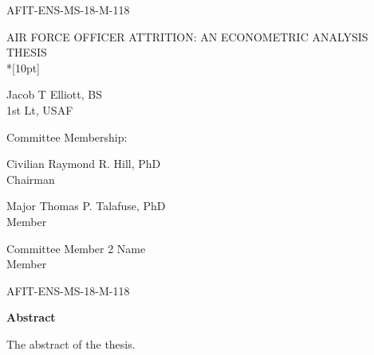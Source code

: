 \documentclass[12pt,letterpaper,toc=flat,oneside]{report}
\theoremstyle{definition}
\theoremstyle{definition}
\theoremstyle{definition}
\theoremstyle{remark}
\begin{document}
	\thispagestyle{empty}
	\setcounter{page}{3}
	\noindent AFIT-ENS-MS-18-M-118
	\vfill
	\begin{center}
	    \MakeUppercase{Air Force Officer Attrition: An Econometric Analysis}\\[10pt]
	    \MakeUppercase{Thesis}\\*[10pt]
	    
	    \begingroup
  \singlespace
    Jacob T Elliott, BS\\ 
    1st Lt, \MakeUppercase{USAF}
    \par
  \endgroup
  
	\bigskip\medskip
	Committee Membership:
	\bigskip\medskip
	
	\begingroup
  \singlespace
    Civilian Raymond R. Hill, PhD\\ 
    Chairman
    \par
  \endgroup
  \bigskip\bigskip
  
  \begingroup
  \singlespace
    Major Thomas P. Talafuse, PhD\\ 
    Member
    \par
  \endgroup
  \bigskip\bigskip
  
  \begingroup
  \singlespace
    Committee Member 2 Name\\ 
    Member
    \par
  \endgroup
  \bigskip\bigskip
  
    
    
  	\end{center}
	\vfill
	\newpage
	\setcounter{page}{4}
	\renewcommand{\thepage}{\roman{page}}
    \thispagestyle{plain}
    \noindent AFIT-ENS-MS-18-M-118
    \begin{center}
	\Large\bfseries Abstract
    \end{center}
    \vspace{2em}
    The abstract of the thesis.
    \newpage
\end{document}
